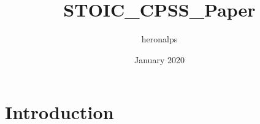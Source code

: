 \documentclass{article}
\title{STOIC_CPSS_Paper}
\author{heronalps }
\date{January 2020}
\begin{document}
\maketitle

\section{Introduction}
\end{document}
